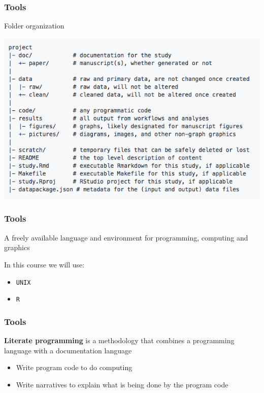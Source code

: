 \documentclass{beamer}
\begin{document}
\begin{frame}
\frametitle{Tools}
\begin{center}\Large{\sc Folder organization}\end{center}
\begin{center}\includegraphics[scale=0.5]{figures/folder_str.png}\end{center}

\end{frame}

\begin{frame}
\frametitle{Tools}
\begin{center}\Large{\sc A freely available language and environment for programming, computing and graphics}\end{center}

In this course we will use:
\begin{itemize}
	\item \texttt{UNIX}
	\item \texttt{R}
\end{itemize}
\end{frame}


\begin{frame}
\frametitle{Tools}
{\bf Literate programming} is a methodology that combines a programming language with a documentation language\\ 
\begin{itemize}
    \item Write program code to do computing
    \item Write narratives to explain what is being done by the program code
\end{itemize}
\end{frame}
\end{document}
